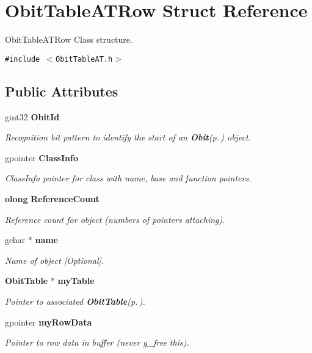 \section{Obit\-Table\-ATRow Struct Reference}
\label{structObitTableATRow}
Obit\-Table\-ATRow Class structure.  


{\tt \#include $<$Obit\-Table\-AT.h$>$}

\subsection*{Public Attributes}
\begin{CompactItemize}
\item 
gint32 {\bf Obit\-Id}
\begin{CompactList}\small\item\em Recognition bit pattern to identify the start of an {\bf Obit}{\rm (p.\,\pageref{structObit})} object. \item\end{CompactList}\item 
gpointer {\bf Class\-Info}
\begin{CompactList}\small\item\em Class\-Info pointer for class with name, base and function pointers. \item\end{CompactList}\item 
{\bf olong} {\bf Reference\-Count}
\begin{CompactList}\small\item\em Reference count for object (numbers of pointers attaching). \item\end{CompactList}\item 
gchar $\ast$ {\bf name}
\begin{CompactList}\small\item\em Name of object [Optional]. \item\end{CompactList}\item 
{\bf Obit\-Table} $\ast$ {\bf my\-Table}
\begin{CompactList}\small\item\em Pointer to associated {\bf Obit\-Table}{\rm (p.\,\pageref{structObitTable})}. \item\end{CompactList}\item 
gpointer {\bf my\-Row\-Data}
\begin{CompactList}\small\item\em Pointer to row data in buffer (never g\_\-free this). \item\end{CompactList}\item 

\end{CompactItemize}
